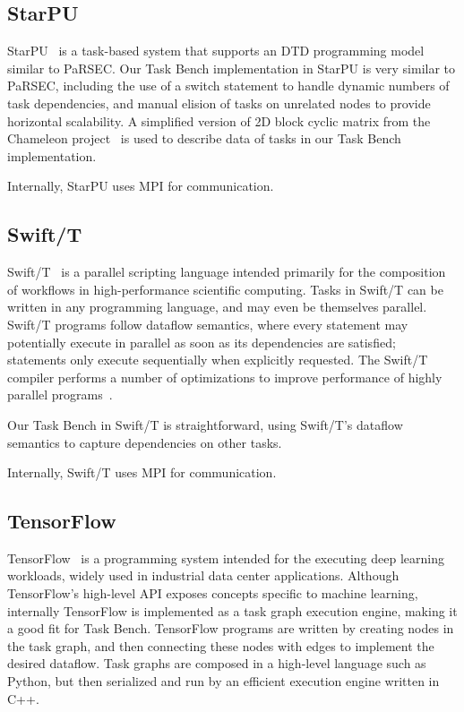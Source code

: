 \subsection{StarPU}

StarPU~\cite{StarPU11} is a task-based system that supports an DTD
programming model similar to PaRSEC. Our Task Bench implementation in
StarPU is very similar to PaRSEC, including the use of a switch
statement to handle dynamic numbers of task dependencies, and manual
elision of tasks on unrelated nodes to provide horizontal scalability.
A simplified version of 2D block cyclic matrix from the Chameleon 
project~\cite{Chameleon} is used to describe data of tasks in 
our Task Bench implementation.

Internally, StarPU uses MPI for communication.

\subsection{Swift/T}

Swift/T~\cite{Wozniak13} is a parallel scripting language intended
primarily for the composition of workflows in high-performance
scientific computing. Tasks in Swift/T can be written in any
programming language, and may even be themselves parallel. Swift/T
programs follow dataflow semantics, where every statement may
potentially execute in parallel as soon as its dependencies are
satisfied; statements only execute sequentially when explicitly
requested. The Swift/T compiler performs a number of optimizations to
improve performance of highly parallel programs~\cite{Armstrong14}.

Our Task Bench in Swift/T is straightforward, using Swift/T's dataflow
semantics to capture dependencies on other tasks.

Internally, Swift/T uses MPI for communication.

\subsection{TensorFlow}

TensorFlow~\cite{TensorFlow15} is a programming system intended for
the executing deep learning workloads, widely used in industrial data
center applications. Although TensorFlow's high-level API exposes
concepts specific to machine learning, internally TensorFlow is
implemented as a task graph execution engine, making it a good fit for
Task Bench. TensorFlow programs are written by creating nodes in the
task graph, and then connecting these nodes with edges to implement
the desired dataflow. Task graphs are composed in a high-level
language such as Python, but then serialized and run by an efficient
execution engine written in C++.

